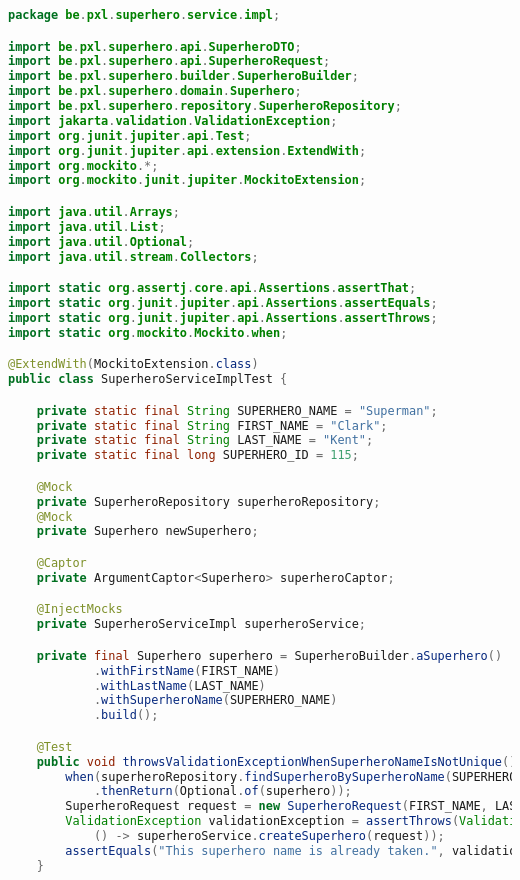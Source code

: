 \begin{lstlisting}[frame=single, language=java]
package be.pxl.superhero.service.impl;

import be.pxl.superhero.api.SuperheroDTO;
import be.pxl.superhero.api.SuperheroRequest;
import be.pxl.superhero.builder.SuperheroBuilder;
import be.pxl.superhero.domain.Superhero;
import be.pxl.superhero.repository.SuperheroRepository;
import jakarta.validation.ValidationException;
import org.junit.jupiter.api.Test;
import org.junit.jupiter.api.extension.ExtendWith;
import org.mockito.*;
import org.mockito.junit.jupiter.MockitoExtension;

import java.util.Arrays;
import java.util.List;
import java.util.Optional;
import java.util.stream.Collectors;

import static org.assertj.core.api.Assertions.assertThat;
import static org.junit.jupiter.api.Assertions.assertEquals;
import static org.junit.jupiter.api.Assertions.assertThrows;
import static org.mockito.Mockito.when;

@ExtendWith(MockitoExtension.class)
public class SuperheroServiceImplTest {

	private static final String SUPERHERO_NAME = "Superman";
	private static final String FIRST_NAME = "Clark";
	private static final String LAST_NAME = "Kent";
	private static final long SUPERHERO_ID = 115;

	@Mock
	private SuperheroRepository superheroRepository;
	@Mock
	private Superhero newSuperhero;

	@Captor
	private ArgumentCaptor<Superhero> superheroCaptor;

	@InjectMocks
	private SuperheroServiceImpl superheroService;

	private final Superhero superhero = SuperheroBuilder.aSuperhero()
			.withFirstName(FIRST_NAME)
			.withLastName(LAST_NAME)
			.withSuperheroName(SUPERHERO_NAME)
			.build();

	@Test
	public void throwsValidationExceptionWhenSuperheroNameIsNotUnique() {
		when(superheroRepository.findSuperheroBySuperheroName(SUPERHERO_NAME))
		    .thenReturn(Optional.of(superhero));
		SuperheroRequest request = new SuperheroRequest(FIRST_NAME, LAST_NAME, SUPERHERO_NAME);
		ValidationException validationException = assertThrows(ValidationException.class, 
		    () -> superheroService.createSuperhero(request));
		assertEquals("This superhero name is already taken.", validationException.getMessage());
	}


\end{lstlisting}
